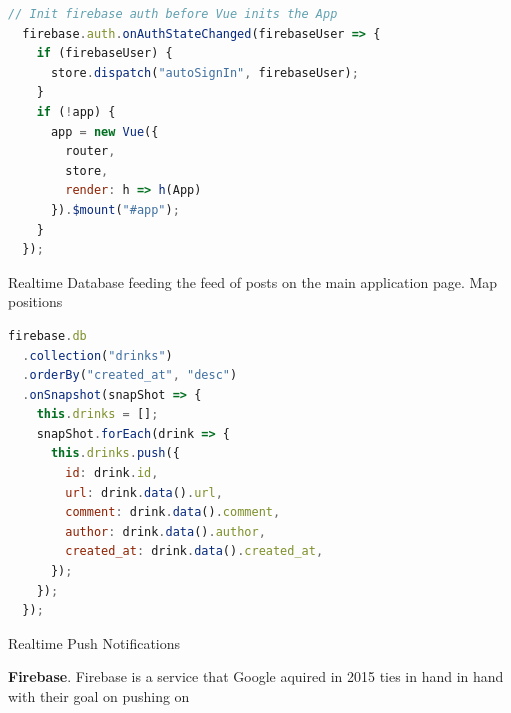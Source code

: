 \begin{lstlisting}[language=JavaScript, caption=main.js: Firebase Auth initiation using VueJS, label=lst:firebase-auth]
  // Init firebase auth before Vue inits the App
  firebase.auth.onAuthStateChanged(firebaseUser => {
    if (firebaseUser) {
      store.dispatch("autoSignIn", firebaseUser);
    }
    if (!app) {
      app = new Vue({
        router,
        store,
        render: h => h(App)
      }).$mount("#app");
    }
  });
\end{lstlisting}

Realtime Database feeding the feed of posts on the main application page. Map positions

\begin{lstlisting}[language=JavaScript, caption=Realtime query for new posts (Home.vue), label=lst:firebase-listposts]
firebase.db
  .collection("drinks")
  .orderBy("created_at", "desc")
  .onSnapshot(snapShot => {
    this.drinks = [];
    snapShot.forEach(drink => {
      this.drinks.push({
        id: drink.id,
        url: drink.data().url,
        comment: drink.data().comment,
        author: drink.data().author,
        created_at: drink.data().created_at,
      });
    });
  });
\end{lstlisting}

Realtime Push Notifications

\textbf{Firebase}. Firebase is a service that Google aquired in 2015 ties in hand in hand with their goal on pushing on
